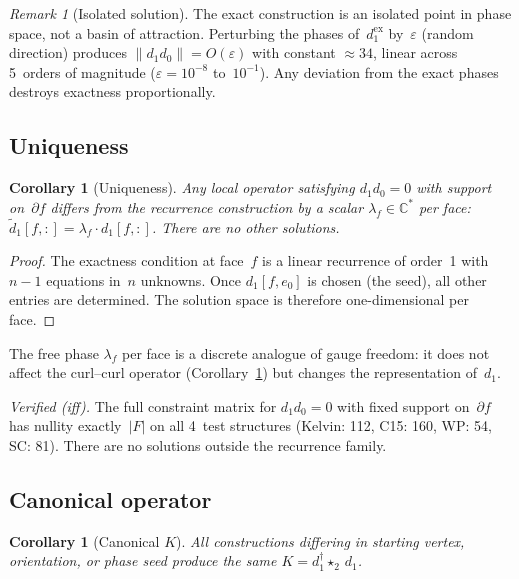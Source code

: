 \documentclass[12pt]{article}
\newtheorem{corollary}[theorem]{Corollary}
\theoremstyle{definition}
\theoremstyle{remark}
\newtheorem{remark}[theorem]{Remark}
\newcommand{\CC}{\mathbb{C}}
\begin{document}
\begin{remark}[Isolated solution]\label{rem:isolated}
The exact construction is an isolated point in phase space, not a basin of
attraction. Perturbing the phases of~$d_1^{\mathrm{ex}}$ by~$\varepsilon$
(random direction) produces $\|d_1 d_0\| = O(\varepsilon)$ with constant
$\approx 34$, linear across 5~orders of magnitude ($\varepsilon = 10^{-8}$
to~$10^{-1}$). Any deviation from the exact phases destroys exactness
proportionally.
\end{remark}

\subsection{Uniqueness}

\begin{corollary}[Uniqueness]\label{cor:unique}
Any local operator satisfying $d_1 d_0 = 0$ with support on~$\partial f$
differs from the recurrence construction by a scalar
$\lambda_f \in \CC^*$ per face: $\tilde{d}_1[f,:] = \lambda_f \cdot d_1[f,:]$.
There are no other solutions.
\end{corollary}

\begin{proof}
The exactness condition at face~$f$ is a linear recurrence of order~1 with
$n{-}1$ equations in~$n$ unknowns. Once $d_1[f, e_0]$ is chosen (the seed),
all other entries are determined. The solution space is therefore
one-dimensional per face.
\end{proof}

The free phase $\lambda_f$ per face is a discrete analogue of gauge freedom:
it does not affect the curl--curl operator (Corollary~\ref{cor:canonical}) but
changes the representation of~$d_1$.

\emph{Verified (iff).} The full constraint matrix for $d_1 d_0 = 0$ with
fixed support on~$\partial f$ has nullity exactly~$|F|$ on all 4~test
structures (Kelvin: 112, C15: 160, WP: 54, SC: 81). There are no solutions
outside the recurrence family.

\subsection{Canonical operator}

\begin{corollary}[Canonical $K$]\label{cor:canonical}
All constructions differing in starting vertex, orientation, or phase seed
produce the same $K = d_1^\dagger \star_2\, d_1$.
\end{corollary}
\end{document}
